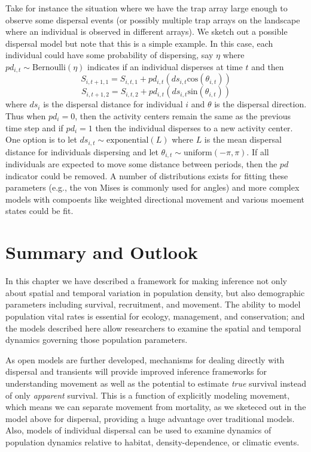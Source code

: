 Take for instance the situation where we have the trap array large
enough to observe some dispersal events (or possibly multiple trap
arrays on the landscape where an individual is observed in different
arrays).  We sketch out a possible dispersal model but note that this
is a simple example.  In this case, each individual could have some
probability of dispersing, say $\eta$ where $pd_{i,t} \sim
\mbox{Bernoulli}(\eta)$ indicates if an individual disperses at time
$t$ and then
\[
S_{i,t+1,1}= S_{i,t,1} + pd_{i,t} (ds_{i, t} \mbox{cos}(\theta_{i,t}))
\]
\[
S_{i,t+1,2}= S_{i,t,2} + pd_{i,t} (ds_{i,t} \mbox{sin}(\theta_{i,t}))
\]
where $ds_i$ is the dispersal distance for individual $i$ and $\theta$
is the dispersal direction.  Thus when $pd_i =0$, then the activity
centers remain the same as the previous time step and if $pd_i = 1$
then the individual disperses to a new activity center.  One option is
to let $ds_{i,t} \sim \mbox{exponential}(L)$ where $L$ is the mean
dispersal distance for individuals dispersing and let $\theta_{i,t}
\sim \mbox{uniform}(-\pi, \pi)$.  If all individuals are expected to
move some distance between periods, then the $pd$ indicator could be
removed.  A number of distributions exists for fitting these
parameters (e.g., the von Mises is commonly used for angles) and more
complex models with compoents like weighted directional movement and
various moement states could be
fit. %



\section{Summary and Outlook}

In this chapter we have described a framework for making inference not
only about spatial and temporal variation in population density, but
also demographic parameters including survival, recruitment, and
movement. The ability to model population vital rates is essential for
ecology, management, and conservation; and the models described here
allow researchers to examine the spatial and temporal dynamics
governing those population parameters.

As open models are further developed, mechanisms for dealing directly
with dispersal and transients will provide improved inference
frameworks for understanding movement as well as the potential to
estimate {\it true} survival instead of only {\it apparent} survival.
This is a function of explicitly modeling movement, which means we can
separate movement from mortality, as we sketeced out in the model
above for dispersal, providing a huge advantage over traditional
models.  Also, models of individual dispersal can be used to examine
dynamics of population dynamics relative to habitat,
density-dependence, or climatic events.

